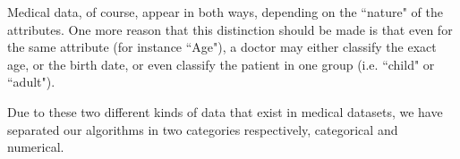 Medical data, of course, appear in both ways, depending on the ``nature" of the attributes.
One more reason that this distinction should be made is that even for the same attribute (for instance ``Age"), a doctor may either classify the exact age, or the birth date, or even classify the patient in one group (i.e. ``child" or ``adult").

Due to these two different kinds of data that exist in medical datasets, we have separated our algorithms in two categories respectively, categorical and numerical.






